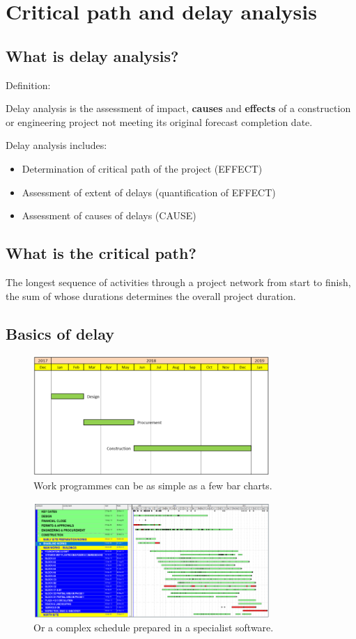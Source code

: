 \section{Critical path and delay analysis}
\subsection{What is delay analysis?}
Definition:
\begin{quoting}
    Delay analysis is the assessment of impact, \textbf{causes} and \textbf{effects} of a construction or engineering project not meeting its original forecast completion date.
\end{quoting}
Delay analysis includes:
\begin{itemize}
    \item Determination of critical path of the project (EFFECT)
    \item Assessment of extent of delays (quantification of EFFECT)
    \item Assessment of causes of delays (CAUSE)
\end{itemize}
\subsection{What is the critical path?}
\begin{quoting}
    The longest sequence of activities through a project network from start to finish, the sum of whose durations determines the overall project duration.
\end{quoting}
\subsection{Basics of delay}
\begin{figure}[H]
    \centering
    \includegraphics[width = 0.8\textwidth]{img/figure28.png}
    \caption{Work programmes can be as simple as a few bar charts.}
\end{figure}
\begin{figure}[H]
    \centering
    \includegraphics[width = 0.8\textwidth]{img/figure29.png}
    \caption{Or a complex schedule prepared in a specialist software.}
\end{figure}
